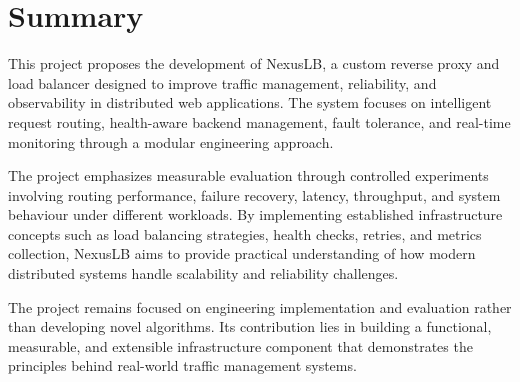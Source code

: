 \documentclass[11pt,a4paper]{article}
\begin{document}
\section{Summary}

This project proposes the development of NexusLB, a custom reverse proxy and load balancer designed to improve traffic management, reliability, and observability in distributed web applications. The system focuses on intelligent request routing, health-aware backend management, fault tolerance, and real-time monitoring through a modular engineering approach.

The project emphasizes measurable evaluation through controlled experiments involving routing performance, failure recovery, latency, throughput, and system behaviour under different workloads. By implementing established infrastructure concepts such as load balancing strategies, health checks, retries, and metrics collection, NexusLB aims to provide practical understanding of how modern distributed systems handle scalability and reliability challenges.

The project remains focused on engineering implementation and evaluation rather than developing novel algorithms. Its contribution lies in building a functional, measurable, and extensible infrastructure component that demonstrates the principles behind real-world traffic management systems.
\end{document}
